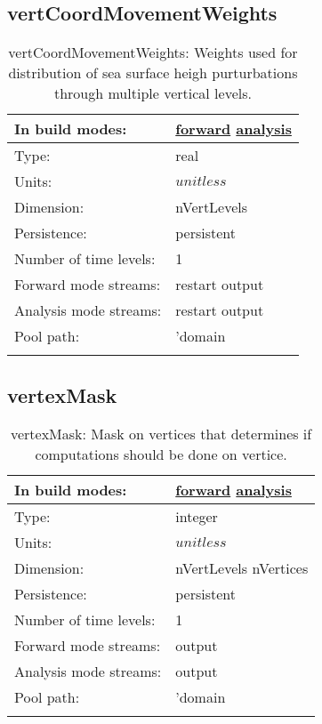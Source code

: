 \subsection[vertCoordMovementWeights]{vertCoordMovementWeights}
\label{subsec:var_sec_mesh_vertCoordMovementWeights}
\begin{center}
\begin{longtable}{| p{2.0in} | p{4.0in} |}
        \hline 
        In build modes: & \hyperref[subsec:forward_var_tab_mesh]{forward} \hyperref[subsec:analysis_var_tab_mesh]{analysis} \\
        \hline 
        Type: & real \\
        \hline 
        Units: & $unitless$ \\
        \hline 
        Dimension: & nVertLevels \\
        \hline 
        Persistence: & persistent \\
        \hline 
        Number of time levels: & 1 \\
        \hline 
		 Forward mode streams: &  restart output \\
        \hline 
		 Analysis mode streams: &  restart output \\
        \hline 
            Pool path: & 'domain %
 \\
		 \hline 
    \caption{vertCoordMovementWeights: Weights used for distribution of sea surface heigh purturbations through multiple vertical levels.}
\end{longtable}
\end{center}
\subsection[vertexMask]{vertexMask}
\label{subsec:var_sec_mesh_vertexMask}
\begin{center}
\begin{longtable}{| p{2.0in} | p{4.0in} |}
        \hline 
        In build modes: & \hyperref[subsec:forward_var_tab_mesh]{forward} \hyperref[subsec:analysis_var_tab_mesh]{analysis} \\
        \hline 
        Type: & integer \\
        \hline 
        Units: & $unitless$ \\
        \hline 
        Dimension: & nVertLevels nVertices \\
        \hline 
        Persistence: & persistent \\
        \hline 
        Number of time levels: & 1 \\
        \hline 
		 Forward mode streams: &  output \\
        \hline 
		 Analysis mode streams: &  output \\
        \hline 
            Pool path: & 'domain %
 \\
		 \hline 
    \caption{vertexMask: Mask on vertices that determines if computations should be done on vertice.}
\end{longtable}
\end{center}
